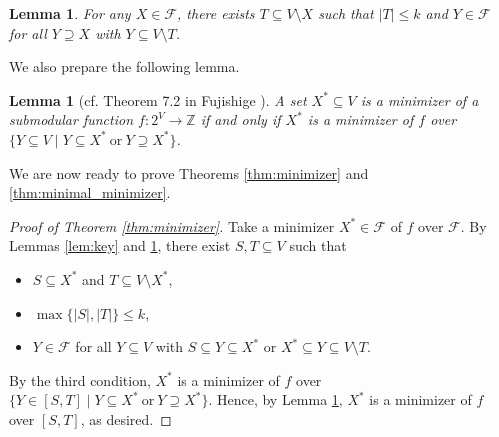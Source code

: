 \documentclass[11pt,letterpaper]{article}
\theoremstyle{plain}
\newtheorem{lemma}[theorem]{Lemma}
\theoremstyle{definition}
\begin{document}
\begin{lemma}
\label{lem:complement}
For any $X\in \mathcal{F}$, there exists $T\subseteq V\setminus X$ such that $|T|\le k$ and $Y\in \mathcal{F}$ for all $Y\supseteq X$ with $Y\subseteq V\setminus T$.
\end{lemma}

We also prepare the following lemma.

\begin{lemma}[cf. Theorem 7.2 in Fujishige \cite{fujishige2005}]
\label{lem:fuji72}
A set $X^*\subseteq V$ is a minimizer of a submodular function $f:2^V\to \mathbb{Z}$ if and only if $X^*$ is a minimizer of $f$ over $\{Y\subseteq V\mid Y\subseteq X^*\mathrm{\ or\ }Y\supseteq X^*\}$.
\end{lemma}

We are now ready to prove Theorems \ref{thm:minimizer} and \ref{thm:minimal_minimizer}.
\begin{proof}[Proof of Theorem \ref{thm:minimizer}]
Take a minimizer $X^*\in \mathcal{F}$ of $f$ over $\mathcal{F}$.
By Lemmas \ref{lem:key} and \ref{lem:complement}, there exist $S,T\subseteq V$ such that
\begin{itemize}
    \item $S\subseteq X^*$ and $T\subseteq V\setminus X^*$,
    \item $\max\{|S|,|T|\}\le k$,
    \item $Y\in \mathcal{F}$ for all $Y\subseteq V$ with $S\subseteq Y\subseteq X^*$ or $X^*\subseteq Y\subseteq V\setminus T$.
\end{itemize}
By the third condition, $X^*$ is a minimizer of $f$ over $\{Y\in [S,T]\mid Y\subseteq X^*\ \mathrm{or\ }Y\supseteq X^*\}$.
Hence, by Lemma \ref{lem:fuji72}, $X^*$ is a minimizer of $f$ over $[S,T]$, as desired.
\end{proof}
\end{document}
